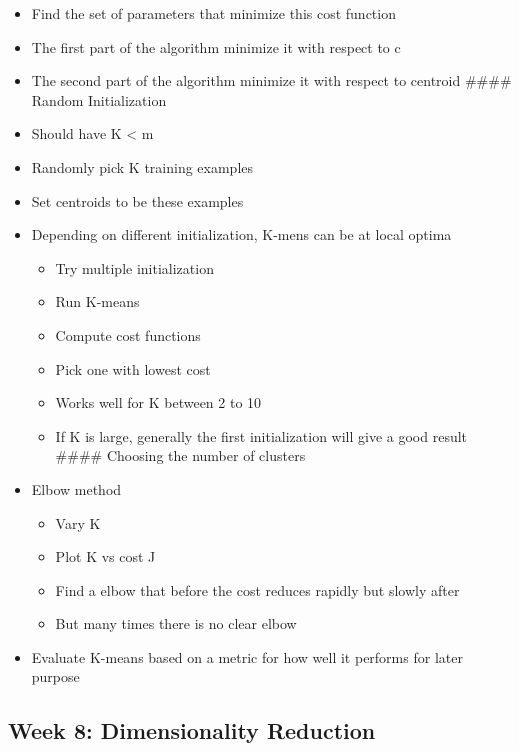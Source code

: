 \documentclass[]{article}
\providecommand{\tightlist}{%
  \setlength{\itemsep}{0pt}\setlength{\parskip}{0pt}}
\begin{document}
\begin{itemize}
\tightlist
\item
  Find the set of parameters that minimize this cost function
\item
  The first part of the algorithm minimize it with respect to c
\item
  The second part of the algorithm minimize it with respect to centroid
  \#\#\#\# Random Initialization
\item
  Should have K \textless{} m
\item
  Randomly pick K training examples
\item
  Set centroids to be these examples
\item
  Depending on different initialization, K-mens can be at local optima

  \begin{itemize}
  \tightlist
  \item
    Try multiple initialization
  \item
    Run K-means
  \item
    Compute cost functions
  \item
    Pick one with lowest cost
  \item
    Works well for K between 2 to 10
  \item
    If K is large, generally the first initialization will give a good
    result \#\#\#\# Choosing the number of clusters
  \end{itemize}
\item
  Elbow method

  \begin{itemize}
  \tightlist
  \item
    Vary K
  \item
    Plot K vs cost J
  \item
    Find a elbow that before the cost reduces rapidly but slowly after
  \item
    But many times there is no clear elbow
  \end{itemize}
\item
  Evaluate K-means based on a metric for how well it performs for later
  purpose
\end{itemize}

\hypertarget{week-8-dimensionality-reduction}{%
\subsection{Week 8: Dimensionality
Reduction}\label{week-8-dimensionality-reduction}}
\end{document}
